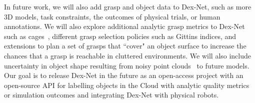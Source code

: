 In future work, we will also add grasp and object data to Dex-Net, such as more 3D models, task constraints, the outcomes of physical trials, or human annotations.
We will also explore additional analytic grasp metrics to Dex-Net such as cages~\cite{diankov2010automated}, different grasp selection policies such as Gittins indices, and extensions to plan a set of grasps that ``cover" an object surface to increase the chances that a grasp is reachable in cluttered environments.
We will also include uncertainty in object shape resulting from noisy point clouds~\cite{mahler2015gp} to future models.
Our goal is to release Dex-Net in the future as an open-access project with an open-source API for labelling objects in the Cloud with analytic quality metrics or simulation outcomes and integrating Dex-Net with physical robots.

